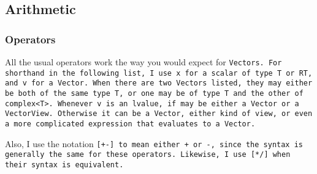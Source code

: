 \subsection{Arithmetic}
\label{Vector_Arithmetic}

\subsubsection{Operators}

All the usual operators work the way you would expect for \tt{Vector}s.  For shorthand in the 
following list, I use \tt{x} for a scalar of type \tt{T} or \tt{RT}, and
\tt{v} for a \tt{Vector}.  When there are two \tt{Vector}s
listed, they may either be both of the same type \tt{T}, or one may be of type 
\tt{T} and the other of \tt{complex<T>}.  Whenever \tt{v} is an lvalue,
if may be either a \tt{Vector} or a \tt{VectorView}.  Otherwise it can
be a \tt{Vector}, either kind of view, or even a more complicated
expression that evaluates to a \tt{Vector}.

Also, I use the notation \tt{[+-]} to mean either \tt{+} or \tt{-}, since
the syntax is generally the same for these operators.
Likewise, I use \tt{[*/]} when their syntax is equivalent.

